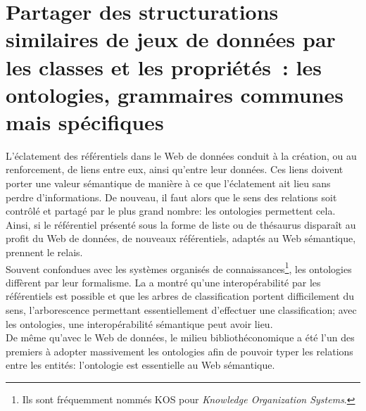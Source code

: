 \chapter{\label{II-B}Partager des structurations similaires de jeux de données par les classes et les propriétés : les ontologies, grammaires communes mais spécifiques}

L'éclatement des référentiels dans le Web de données conduit à la création, ou au renforcement, de liens entre eux, ainsi qu'entre leur données. Ces liens doivent porter une valeur sémantique de manière à ce que l'éclatement ait lieu sans perdre d'informations. De nouveau, il faut alors que le sens des relations soit contrôlé et partagé par le plus grand nombre: les ontologies permettent cela. Ainsi, si le référentiel présenté sous la forme de liste ou de thésaurus disparaît au profit du Web de données, de nouveaux référentiels, adaptés au Web sémantique, prennent le relais.\\

Souvent confondues avec les systèmes organisés de connaissances\footnote{Ils sont fréquemment nommés KOS pour \textit{Knowledge Organization Systems}.}, les ontologies diffèrent par leur formalisme. La  a montré qu'une interopérabilité par les référentiels est possible et que les arbres de classification portent difficilement du sens, l'arborescence permettant essentiellement d'effectuer une classification; avec les ontologies, une interopérabilité sémantique peut avoir lieu.\\

De même qu'avec le Web de données, le milieu bibliothéconomique a été l'un des premiers à adopter massivement les ontologies afin de pouvoir typer les relations entre les entités: l'ontologie est essentielle au Web sémantique.\\





